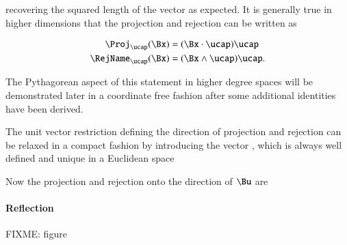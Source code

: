 recovering the squared length of the vector as expected.  It is generally true in higher dimensions that the projection and rejection can be written as

\begin{dmath}\label{eqn:SimpleProducts2:800}
\begin{aligned}
\Proj_\ucap(\Bx) &= (\Bx \cdot \ucap) \ucap \\
\RejName_\ucap(\Bx) &= (\Bx \wedge \ucap) \ucap.
\end{aligned}
\end{dmath}

The Pythagorean aspect of this statement in higher degree spaces
will be demonstrated later in a coordinate free fashion after some additional identities have been derived.

The unit vector restriction defining the direction of projection and rejection can be relaxed in a compact fashion by introducing the vector , which is always well defined and unique in a Euclidean space


Now the projection and rejection onto the direction of \( \Bu \) are



\paragraph{Reflection}
FIXME: figure

